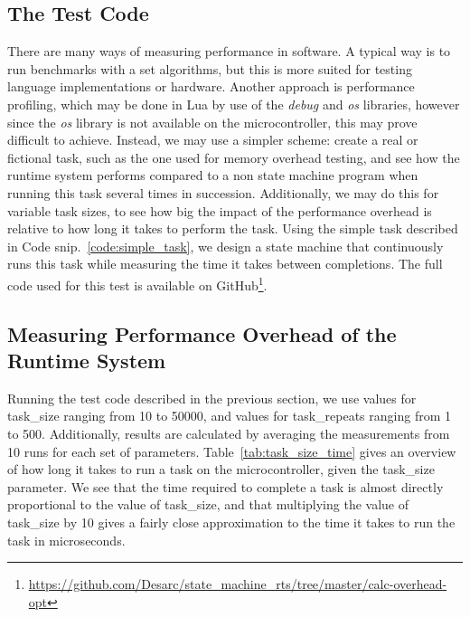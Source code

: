 \subsection{The Test Code}
\label{sec:performance_test_code}
There are many ways of measuring performance in software. A typical way is to run benchmarks with a set algorithms, but this is more suited for testing language implementations or hardware. Another approach is performance profiling, which may be done in Lua by use of the \emph{debug} and \emph{os} libraries, however since the \emph{os} library is not available on the microcontroller, this may prove difficult to achieve. Instead, we may use a simpler scheme: create a real or fictional task, such as the one used for memory overhead testing, and see how the runtime system performs compared to a non state machine program when running this task several times in succession. Additionally, we may do this for variable task sizes, to see how big the impact of the performance overhead is relative to how long it takes to perform the task. Using the simple task described in Code snip.~\ref{code:simple_task}, we design a state machine that continuously runs this task while measuring the time it takes between completions. The full code used for this test is available on GitHub\footnote{\url{https://github.com/Desarc/state_machine_rts/tree/master/calc-overhead-opt}}.

\subsection{Measuring Performance Overhead of the Runtime System}
\label{sec:performance_overhead_measure}
Running the test code described in the previous section, we use values for task\_size ranging from 10 to 50000, and values for task\_repeats ranging from 1 to 500. Additionally, results are calculated by averaging the measurements from 10 runs for each set of parameters. Table~\ref{tab:task_size_time} gives an overview of how long it takes to run a task on the microcontroller, given the task\_size parameter. We see that the time required to complete a task is almost directly proportional to the value of task\_size, and that multiplying the value of task\_size by 10 gives a fairly close approximation to the time it takes to run the task in microseconds.

